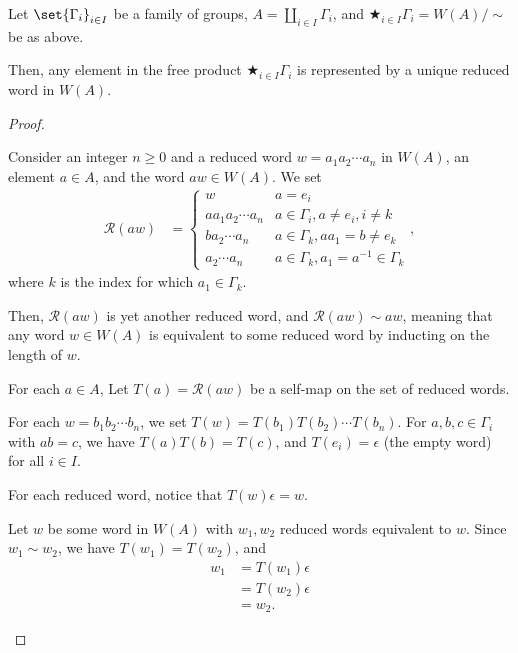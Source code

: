 \documentclass[10pt]{mypackage}
\begin{document}
\begin{proposition}
  Let $\set{\Gamma_i}_{i\in I}$ be a family of groups, $A = \coprod_{i\in I}\Gamma_i$, and $\bigstar_{i\in I}\Gamma_i = W(A)/\sim$ be as above.\newline

  Then, any element in the free product $\bigstar_{i\in I}\Gamma_i$ is represented by a unique reduced word in $W(A)$.
\end{proposition}
\begin{proof}\hfill
  \begin{description}[font=\normalfont\scshape,leftmargin=0pt]
    \item[Existence:] Consider an integer $n\geq 0$ and a reduced word $w = a_1a_2\cdots a_n$ in $W(A)$, an element $a\in A$, and the word $aw\in W(A)$. We set
      \begin{align*}
        \mathcal{R}\left(aw\right) &= \begin{cases}
          w & a = e_i\\
          aa_1a_2\cdots a_n & a\in \Gamma_i,a\neq e_i,i\neq k\\
          ba_2\cdots a_n & a\in \Gamma_k, aa_1 = b \neq e_k\\
          a_2\cdots a_n & a\in \Gamma_k,a_1 = a^{-1}\in \Gamma_k
        \end{cases},
      \end{align*}
      where $k$ is the index for which $a_1\in \Gamma_k$.\newline

      Then, $\mathcal{R}\left(aw\right)$ is yet another reduced word, and $\mathcal{R}\left(aw\right) \sim aw$, meaning that any word $w\in W(A)$ is equivalent to some reduced word by inducting on the length of $w$.
    \item[Uniqueness:] For each $a\in A$, Let $T(a) = \mathcal{R}\left(aw\right)$ be a self-map on the set of reduced words.\newline

      For each $w = b_1b_2\cdots b_n$, we set $T(w) = T\left(b_1\right)T\left(b_2\right)\cdots T\left(b_n\right)$. For $a,b,c\in \Gamma_i$ with $ab = c$, we have $T\left(a\right)T\left(b\right) = T\left(c\right)$, and $T\left(e_{i}\right) = \epsilon$ (the empty word) for all $i\in I$.\newline

       For each reduced word, notice that $T\left(w\right)\epsilon = w$.\newline

       Let $w$ be some word in $W(A)$ with $w_1,w_2$ reduced words equivalent to $w$. Since $w_1\sim w_2$, we have $T\left(w_1\right) = T\left(w_2\right)$, and
       \begin{align*}
         w_1 &= T\left(w_1\right)\epsilon\\
             &= T\left(w_2\right)\epsilon\\
             &= w_2.
       \end{align*}
  \end{description}
\end{proof}
\end{document}

